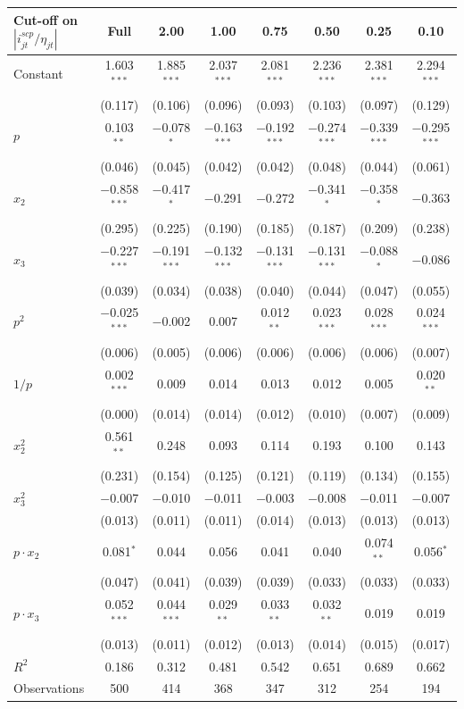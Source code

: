 \begin{tabular}{lccccccc}
\toprule
Cut-off on $|i^{scp}_{jt}/\eta_{jt}|$ & Full & 2.00 & 1.00 & 0.75 & 0.50 & 0.25 & 0.10 \\
\midrule
Constant & 1.603$^{***}$ & 1.885$^{***}$ & 2.037$^{***}$ & 2.081$^{***}$ & 2.236$^{***}$ & 2.381$^{***}$ & 2.294$^{***}$ \\
 & (0.117) & (0.106) & (0.096) & (0.093) & (0.103) & (0.097) & (0.129) \\
$p$ & 0.103$^{**}$ & $-$0.078$^{*}$ & $-$0.163$^{***}$ & $-$0.192$^{***}$ & $-$0.274$^{***}$ & $-$0.339$^{***}$ & $-$0.295$^{***}$ \\
 & (0.046) & (0.045) & (0.042) & (0.042) & (0.048) & (0.044) & (0.061) \\
$x_2$ & $-$0.858$^{***}$ & $-$0.417$^{*}$ & $-$0.291 & $-$0.272 & $-$0.341$^{*}$ & $-$0.358$^{*}$ & $-$0.363 \\
 & (0.295) & (0.225) & (0.190) & (0.185) & (0.187) & (0.209) & (0.238) \\
$x_3$ & $-$0.227$^{***}$ & $-$0.191$^{***}$ & $-$0.132$^{***}$ & $-$0.131$^{***}$ & $-$0.131$^{***}$ & $-$0.088$^{*}$ & $-$0.086 \\
 & (0.039) & (0.034) & (0.038) & (0.040) & (0.044) & (0.047) & (0.055) \\
$p^2$ & $-$0.025$^{***}$ & $-$0.002 & 0.007 & 0.012$^{**}$ & 0.023$^{***}$ & 0.028$^{***}$ & 0.024$^{***}$ \\
 & (0.006) & (0.005) & (0.006) & (0.006) & (0.006) & (0.006) & (0.007) \\
$1/p$ & 0.002$^{***}$ & 0.009 & 0.014 & 0.013 & 0.012 & 0.005 & 0.020$^{**}$ \\
 & (0.000) & (0.014) & (0.014) & (0.012) & (0.010) & (0.007) & (0.009) \\
$x_2^2$ & 0.561$^{**}$ & 0.248 & 0.093 & 0.114 & 0.193 & 0.100 & 0.143 \\
 & (0.231) & (0.154) & (0.125) & (0.121) & (0.119) & (0.134) & (0.155) \\
$x_3^2$ & $-$0.007 & $-$0.010 & $-$0.011 & $-$0.003 & $-$0.008 & $-$0.011 & $-$0.007 \\
 & (0.013) & (0.011) & (0.011) & (0.014) & (0.013) & (0.013) & (0.013) \\
$p\cdot x_2$ & 0.081$^{*}$ & 0.044 & 0.056 & 0.041 & 0.040 & 0.074$^{**}$ & 0.056$^{*}$ \\
 & (0.047) & (0.041) & (0.039) & (0.039) & (0.033) & (0.033) & (0.033) \\
$p\cdot x_3$ & 0.052$^{***}$ & 0.044$^{***}$ & 0.029$^{**}$ & 0.033$^{**}$ & 0.032$^{**}$ & 0.019 & 0.019 \\
 & (0.013) & (0.011) & (0.012) & (0.013) & (0.014) & (0.015) & (0.017) \\
\midrule
$R^2$ & 0.186 & 0.312 & 0.481 & 0.542 & 0.651 & 0.689 & 0.662 \\
Observations & 500 & 414 & 368 & 347 & 312 & 254 & 194 \\
\bottomrule
\end{tabular}
